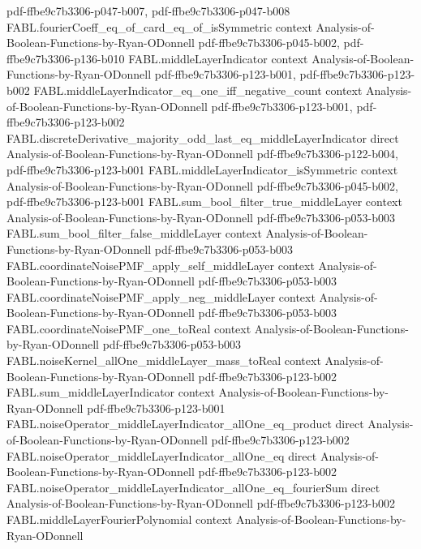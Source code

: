 \begin{theorem}
  {pdf-ffbe9c7b3306-p047-b007,
    pdf-ffbe9c7b3306-p047-b008}
\proofstep
  {FABL.fourierCoeff_eq_of_card_eq_of_isSymmetric}
  {context}
  {Analysis-of-Boolean-Functions-by-Ryan-ODonnell}
  {pdf-ffbe9c7b3306-p045-b002,
    pdf-ffbe9c7b3306-p136-b010}
\proofstep
  {FABL.middleLayerIndicator}
  {context}
  {Analysis-of-Boolean-Functions-by-Ryan-ODonnell}
  {pdf-ffbe9c7b3306-p123-b001,
    pdf-ffbe9c7b3306-p123-b002}
\proofstep
  {FABL.middleLayerIndicator_eq_one_iff_negative_count}
  {context}
  {Analysis-of-Boolean-Functions-by-Ryan-ODonnell}
  {pdf-ffbe9c7b3306-p123-b001,
    pdf-ffbe9c7b3306-p123-b002}
\proofstep
  {FABL.discreteDerivative_majority_odd_last_eq_middleLayerIndicator}
  {direct}
  {Analysis-of-Boolean-Functions-by-Ryan-ODonnell}
  {pdf-ffbe9c7b3306-p122-b004,
    pdf-ffbe9c7b3306-p123-b001}
\proofstep
  {FABL.middleLayerIndicator_isSymmetric}
  {context}
  {Analysis-of-Boolean-Functions-by-Ryan-ODonnell}
  {pdf-ffbe9c7b3306-p045-b002,
    pdf-ffbe9c7b3306-p123-b001}
\proofstep
  {FABL.sum_bool_filter_true_middleLayer}
  {context}
  {Analysis-of-Boolean-Functions-by-Ryan-ODonnell}
  {pdf-ffbe9c7b3306-p053-b003}
\proofstep
  {FABL.sum_bool_filter_false_middleLayer}
  {context}
  {Analysis-of-Boolean-Functions-by-Ryan-ODonnell}
  {pdf-ffbe9c7b3306-p053-b003}
\proofstep
  {FABL.coordinateNoisePMF_apply_self_middleLayer}
  {context}
  {Analysis-of-Boolean-Functions-by-Ryan-ODonnell}
  {pdf-ffbe9c7b3306-p053-b003}
\proofstep
  {FABL.coordinateNoisePMF_apply_neg_middleLayer}
  {context}
  {Analysis-of-Boolean-Functions-by-Ryan-ODonnell}
  {pdf-ffbe9c7b3306-p053-b003}
\proofstep
  {FABL.coordinateNoisePMF_one_toReal}
  {context}
  {Analysis-of-Boolean-Functions-by-Ryan-ODonnell}
  {pdf-ffbe9c7b3306-p053-b003}
\proofstep
  {FABL.noiseKernel_allOne_middleLayer_mass_toReal}
  {context}
  {Analysis-of-Boolean-Functions-by-Ryan-ODonnell}
  {pdf-ffbe9c7b3306-p123-b002}
\proofstep
  {FABL.sum_middleLayerIndicator}
  {context}
  {Analysis-of-Boolean-Functions-by-Ryan-ODonnell}
  {pdf-ffbe9c7b3306-p123-b001}
\proofstep
  {FABL.noiseOperator_middleLayerIndicator_allOne_eq_product}
  {direct}
  {Analysis-of-Boolean-Functions-by-Ryan-ODonnell}
  {pdf-ffbe9c7b3306-p123-b002}
\proofstep
  {FABL.noiseOperator_middleLayerIndicator_allOne_eq}
  {direct}
  {Analysis-of-Boolean-Functions-by-Ryan-ODonnell}
  {pdf-ffbe9c7b3306-p123-b002}
\proofstep
  {FABL.noiseOperator_middleLayerIndicator_allOne_eq_fourierSum}
  {direct}
  {Analysis-of-Boolean-Functions-by-Ryan-ODonnell}
  {pdf-ffbe9c7b3306-p123-b002}
\proofstep
  {FABL.middleLayerFourierPolynomial}
  {context}
  {Analysis-of-Boolean-Functions-by-Ryan-ODonnell}

\end{theorem}
